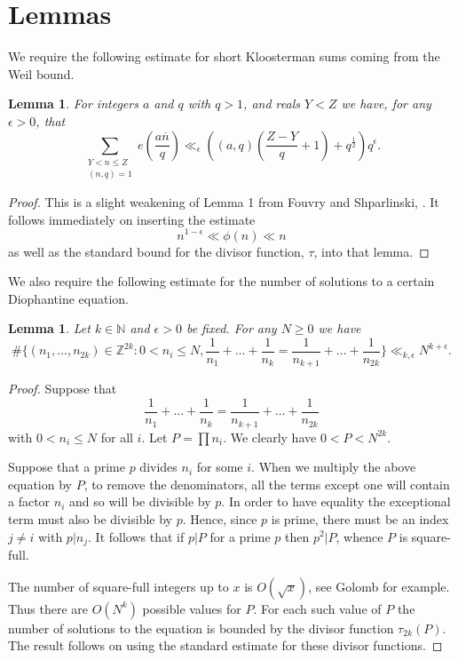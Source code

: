 \documentclass[12pt]{article}
\newcommand{\N}{\mathbb N}
\newcommand{\Z}{\mathbb Z}
\newcommand{\twosum}[2]{\sum_{\substack{#1\\#2}}}
\newtheorem{lem}[defn]{Lemma}
\begin{document}
\section{Lemmas}

We require the following estimate for short Kloosterman sums coming from the Weil bound.

\begin{lem}\label{weil}
For integers $a$ and $q$ with $q>1$, and reals $Y<Z$ we have, for any $\epsilon>0$, that  
$$\twosum{Y<n\leq Z}{(n,q)=1}e(\frac{a\overline n}{q})\ll_\epsilon ((a,q)(\frac{Z-Y}{q}+1)+q^{\frac12})q^\epsilon.$$
\end{lem}
\begin{proof}
This is a slight weakening of Lemma 1 from Fouvry and Shparlinski, \cite{foushpar}.  It follows immediately on inserting the estimate 
$$n^{1-\epsilon}\ll \phi(n)\ll n$$
as well as the standard bound for the divisor function, $\tau$, into that lemma.
\end{proof}

We also require the following estimate for the number of solutions to a certain Diophantine equation.

\begin{lem}\label{cayley}
Let $k\in \N$ and $\epsilon>0$ be fixed.  For any $N\geq 0$ we have 
$$\#\{(n_1,\ldots,n_{2k})\in \Z^{2k}:0<n_i\leq N,\frac{1}{n_1}+\ldots+\frac{1}{n_k}=\frac{1}{n_{k+1}}+\ldots+\frac{1}{n_{2k}}\}\ll_{k,\epsilon} N^{k+\epsilon}.$$
\end{lem}
\begin{proof}
Suppose that 
$$\frac{1}{n_1}+\ldots+\frac{1}{n_k}=\frac{1}{n_{k+1}}+\ldots+\frac{1}{n_{2k}}$$
with $0<n_i\leq N$ for all $i$.  Let $P=\prod n_i$.  We clearly have 
$0<P<N^{2k}$.  

Suppose that a prime $p$ divides $n_i$ for some $i$.  When we multiply
the above equation by $P$, to remove the denominators, all the terms
except one will contain a factor $n_i$ and so will be divisible by $p$.  In order to have equality the exceptional term must also be divisible by $p$. Hence, since $p$ is prime, there must be an index $j\ne i$ with $p|n_j$.  It follows that if $p|P$ for a prime $p$ then 
$p^2|P$, whence $P$ is square-full.  

The number of square-full integers up to $x$ is $O(\sqrt{x})$, see Golomb \cite{golomb} for example.  Thus there are $O(N^k)$ possible values for $P$.  For each such value of $P$ the number of solutions to the equation is bounded by the divisor function $\tau_{2k}(P)$.  The result follows on using the standard estimate for these divisor functions.
\end{proof}
\end{document}
